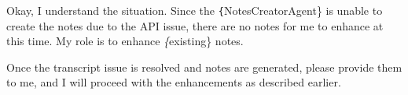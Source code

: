 \documentclass[11pt,a4paper]{article}
\begin{document}
Okay, I understand the situation. Since the \texttt\{NotesCreatorAgent\} is unable to create the notes due to the API issue, there are no notes for me to enhance at this time. My role is to enhance \textit\{existing\} notes.

Once the transcript issue is resolved and notes are generated, please provide them to me, and I will proceed with the enhancements as described earlier.
\end{document}
